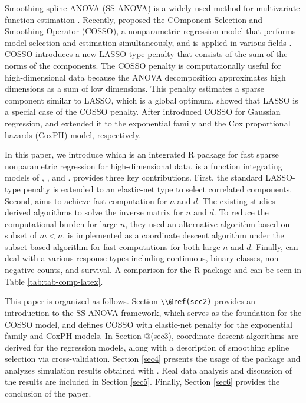 Smoothing spline ANOVA (SS-ANOVA) is a widely used method for multivariate function estimation \citep[Gu:2013]{Wahba:1990}. Recently, \citet{Lin:2006} proposed the COmponent Selection and Smoothing Operator (COSSO), a nonparametric regression model that performs model selection and estimation simultaneously, and is applied in various fields \citep[Dempsey:2017]{Kavuri:2017}. COSSO introduces a new LASSO-type penalty that consists of the sum of the norms of the components. The COSSO penalty is computationally useful for high-dimensional data because the ANOVA decomposition approximates high dimensions as a sum of low dimensions. This penalty estimates a sparse component similar to LASSO, which is a global optimum. \citet{Lin:2006} showed that LASSO is a special case of the COSSO penalty. After \citet{Lin:2006} introduced COSSO for Gaussian regression, \citet{Zhang:2006} and \citet{Leng:2006} extended it to the exponential family and the Cox proportional hazards (CoxPH) model, respectively.

In this paper, we introduce  which is an integrated R package for fast sparse nonparametric regression for high-dimensional data.  is a function integrating models of \citet{Zhang:2006}, \citet{Lin:2006}, and \citet{Leng:2006}.  provides three key contributions. First, the standard LASSO-type penalty is extended to an elastic-net type to select correlated components. Second,  aims to achieve fast computation for \(n\) and \(d\). The existing studies derived algorithms to solve the inverse matrix for \(n\) and \(d\). To reduce the computational burden for large \(n\), they used an alternative algorithm based on subset of \(m < n\).  is implemented as a coordinate descent algorithm under the subset-based algorithm for fast computations for both large \(n\) and \(d\). Finally,  can deal with a various response types including continuous, binary classes, non-negative counts, and survival. A comparison for the R package  and  can be seen in Table \ref{tab:tab-comp-latex}.

This paper is organized as follows. Section \texttt{\textbackslash{}\textbackslash{}@ref(sec2)} provides an introduction to the SS-ANOVA framework, which serves as the foundation for the COSSO model, and defines COSSO with elastic-net penalty for the exponential family and CoxPH models. In Section @(sec3), coordinate descent algorithms are derived for the regression models, along with a description of smoothing spline selection via cross-validation. Section \ref{sec4} presents the usage of the  package and analyzes simulation results obtained with . Real data analysis and discussion of the results are included in Section \ref{sec5}. Finally, Section \ref{sec6} provides the conclusion of the paper.

